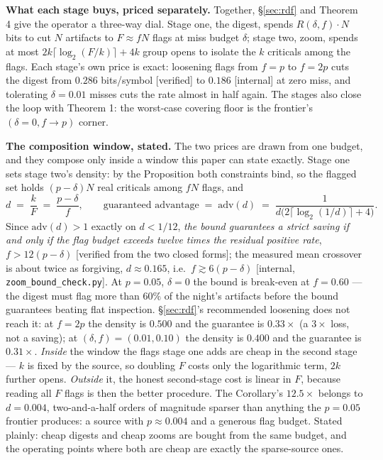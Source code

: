 \documentclass[11pt,a4paper]{article}
\begin{document}
\textbf{What each stage buys, priced separately.} Together, \S\ref{sec:rdf} and Theorem 4 give the operator a three-way dial. Stage one, the digest, spends $R(\delta,f)\cdot N$ bits to cut $N$ artifacts to $F\approx fN$ flags at miss budget $\delta$; stage two, zoom, spends at most $2k\lceil\log_2(F/k)\rceil+4k$ group opens to isolate the $k$ criticals among the flags. Each stage's own price is exact: loosening flags from $f{=}p$ to $f{=}2p$ cuts the digest from $0.286$ bits/symbol [verified] to $0.186$ [internal] at zero miss, and tolerating $\delta{=}0.01$ misses cuts the rate almost in half again. The stages also close the loop with Theorem 1: the worst-case covering floor is the frontier's $(\delta{=}0, f{\to}p)$ corner.

\textbf{The composition window, stated.} The two prices are drawn from one budget, and they compose only inside a window this paper can state exactly. Stage one sets stage two's density: by the Proposition both constraints bind, so the flagged set holds $(p-\delta)N$ real criticals among $fN$ flags, and
\[
d\;=\;\frac{k}{F}\;=\;\frac{p-\delta}{f},
\qquad\text{guaranteed advantage}\;=\;\mathrm{adv}(d)\;=\;\frac{1}{d\bigl(2\lceil\log_2(1/d)\rceil+4\bigr)} .
\]
Since $\mathrm{adv}(d)>1$ exactly on $d<1/12$, \emph{the bound guarantees a strict saving if and only if the flag budget exceeds twelve times the residual positive rate}, $f>12(p-\delta)$ [verified from the two closed forms]; the measured mean crossover is about twice as forgiving, $d\approx0.165$, i.e.\ $f\gtrsim6(p-\delta)$ [internal, \texttt{zoom\_bound\_check.py}]. At $p{=}0.05$, $\delta{=}0$ the bound is break-even at $f=0.60$ --- the digest must flag more than $60\%$ of the night's artifacts before the bound guarantees beating flat inspection. \S\ref{sec:rdf}'s recommended loosening does not reach it: at $f{=}2p$ the density is $0.500$ and the guarantee is $0.33\times$ (a $3\times$ loss, not a saving); at $(\delta,f)=(0.01,0.10)$ the density is $0.400$ and the guarantee is $0.31\times$. \emph{Inside} the window the flags stage one adds are cheap in the second stage --- $k$ is fixed by the source, so doubling $F$ costs only the logarithmic term, $2k$ further opens. \emph{Outside} it, the honest second-stage cost is linear in $F$, because reading all $F$ flags is then the better procedure. The Corollary's $12.5\times$ belongs to $d{=}0.004$, two-and-a-half orders of magnitude sparser than anything the $p{=}0.05$ frontier produces: a source with $p\approx0.004$ and a generous flag budget. Stated plainly: cheap digests and cheap zooms are bought from the same budget, and the operating points where both are cheap are exactly the sparse-source ones.
\end{document}
